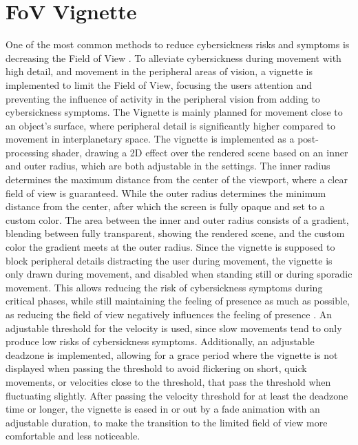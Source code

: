 \section{FoV Vignette}\label{sec:fov-vignette}

One of the most common methods to reduce cybersickness risks and symptoms is decreasing the Field of View \cite{Duh2001}
\cite{Lin2002}.
To alleviate cybersickness during movement with high detail, and movement in the peripheral areas of vision, a
vignette is implemented to limit the Field of View, focusing the users attention and preventing the influence of
activity in the peripheral vision from adding to cybersickness symptoms.
The Vignette is mainly planned for movement close to an object's surface, where peripheral detail is significantly
higher compared to movement in interplanetary space.
The vignette is implemented as a post-processing shader, drawing a 2D effect over the rendered scene based on an
inner and outer radius, which are both adjustable in the settings.
The inner radius determines the maximum distance from the center of the viewport, where a clear field of view is
guaranteed.
While the outer radius determines the minimum distance from the center, after which the screen is fully opaque and
set to a custom color.
The area between the inner and outer radius consists of a gradient, blending between fully transparent, showing the
rendered scene, and the custom color the gradient meets at the outer radius.
Since the vignette is supposed to block peripheral details distracting the user during movement, the vignette is only
drawn during movement, and disabled when standing still or during sporadic movement.
This allows reducing the risk of cybersickness symptoms during critical phases, while still maintaining the feeling
of presence as much as possible, as reducing the field of view negatively influences the feeling of presence \cite{Lin2002}.
An adjustable threshold for the velocity is used, since slow movements tend to only produce low risks of cybersickness
symptoms.
Additionally, an adjustable deadzone is implemented, allowing for a grace period where the vignette is not displayed
when passing the threshold to avoid flickering on short, quick movements, or velocities close to the threshold, that
pass the threshold when fluctuating slightly.
After passing the velocity threshold for at least the deadzone time or longer, the vignette is eased in or out by a
fade animation with an adjustable duration, to make the transition to the limited field of view more comfortable and
less noticeable.
